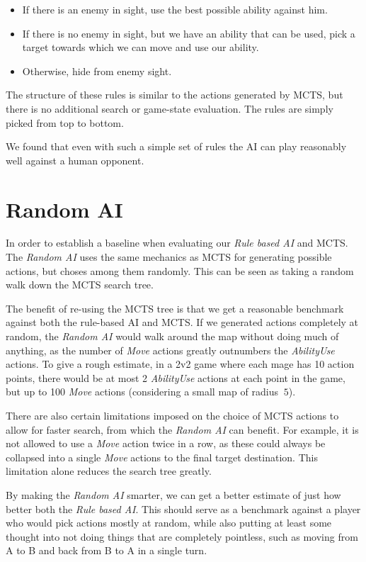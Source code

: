 \begin{itemize}
\item If there is an enemy in sight, use the best possible ability against him.
\item If there is no enemy in sight, but we have an ability that can be used, pick a target towards which we can move and use our ability.
\item Otherwise, hide from enemy sight.
\end{itemize}

The structure of these rules is similar to the actions generated by MCTS,
but there is no additional search or game-state evaluation. The rules are
simply picked from top to bottom.

We found that even with such a simple set of rules the AI can play reasonably
well against a human opponent.

\section{Random AI}

In order to establish a baseline when evaluating our \emph{Rule based AI} and MCTS\@.
The \emph{Random AI} uses the same mechanics as MCTS for generating possible actions,
but choses among them randomly. This can be seen as taking a random walk down
the MCTS search tree.

The benefit of re-using the MCTS tree is that we get a reasonable benchmark against
both the rule-based AI and MCTS\@. If we generated actions completely at random, the \emph{Random AI}
would walk around the map without doing much of anything, as the number of \emph{Move} actions
greatly outnumbers the \emph{AbilityUse} actions. To give a rough estimate, in a 2v2 game where
each mage has 10 action points, there would be at most 2 \emph{AbilityUse} actions at each point
in the game, but up to 100 \emph{Move} actions (considering a small map of radius $~5$).

There are also certain limitations imposed on the choice of MCTS actions to allow for faster search,
from which the \emph{Random AI} can benefit. For example, it is not allowed to use a \emph{Move}
action twice in a row, as these could always be collapsed into a single \emph{Move} actions to the
final target destination. This limitation alone reduces the search tree greatly.

By making the \emph{Random AI} smarter, we can get a better estimate of just how better
both the \emph{Rule based AI}. This should serve as a benchmark against a player who would
pick actions mostly at random, while also putting at least some thought into not doing things
that are completely pointless, such as moving from A to B and back from B to A in a single turn.
